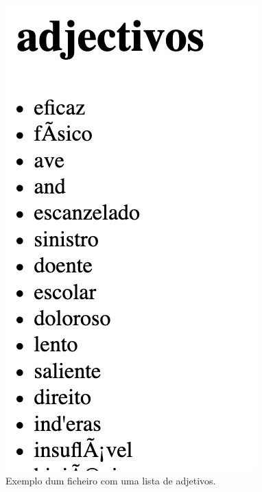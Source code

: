 \documentclass[11pt,a4paper]{report}
\begin{document}
\begin{figure}[H]
\centering
\includegraphics[scale=0.6]{adjetivos.png}
\caption{Exemplo dum ficheiro com uma lista de adjetivos.}
\label{img:adjetivos}
\end{figure}
\end{document}

